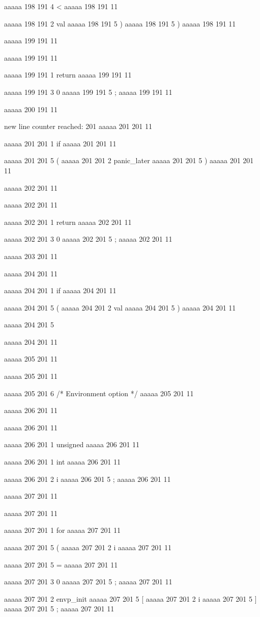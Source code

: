 {aaaaa 198 191
4
<
aaaaa 198 191
11
 
aaaaa 198 191
2
val
aaaaa 198 191
5
)
aaaaa 198 191
5
)
aaaaa 198 191
11


aaaaa 199 191
11
	
aaaaa 199 191
11
	
aaaaa 199 191
1
return
aaaaa 199 191
11
 
aaaaa 199 191
3
0
aaaaa 199 191
5
;
aaaaa 199 191
11


aaaaa 200 191
11


new line counter reached: 201
aaaaa 201 201
11
	
aaaaa 201 201
1
if
aaaaa 201 201
11
 
aaaaa 201 201
5
(
aaaaa 201 201
2
panic_later
aaaaa 201 201
5
)
aaaaa 201 201
11


aaaaa 202 201
11
	
aaaaa 202 201
11
	
aaaaa 202 201
1
return
aaaaa 202 201
11
 
aaaaa 202 201
3
0
aaaaa 202 201
5
;
aaaaa 202 201
11


aaaaa 203 201
11


aaaaa 204 201
11
	
aaaaa 204 201
1
if
aaaaa 204 201
11
 
aaaaa 204 201
5
(
aaaaa 204 201
2
val
aaaaa 204 201
5
)
aaaaa 204 201
11
 
aaaaa 204 201
5
{
aaaaa 204 201
11


aaaaa 205 201
11
	
aaaaa 205 201
11
	
aaaaa 205 201
6
/* Environment option */
aaaaa 205 201
11


aaaaa 206 201
11
	
aaaaa 206 201
11
	
aaaaa 206 201
1
unsigned
aaaaa 206 201
11
 
aaaaa 206 201
1
int
aaaaa 206 201
11
 
aaaaa 206 201
2
i
aaaaa 206 201
5
;
aaaaa 206 201
11


aaaaa 207 201
11
	
aaaaa 207 201
11
	
aaaaa 207 201
1
for
aaaaa 207 201
11
 
aaaaa 207 201
5
(
aaaaa 207 201
2
i
aaaaa 207 201
11
 
aaaaa 207 201
5
=
aaaaa 207 201
11
 
aaaaa 207 201
3
0
aaaaa 207 201
5
;
aaaaa 207 201
11
 
aaaaa 207 201
2
envp_init
aaaaa 207 201
5
[
aaaaa 207 201
2
i
aaaaa 207 201
5
]
aaaaa 207 201
5
;
aaaaa 207 201
11
 
}}
